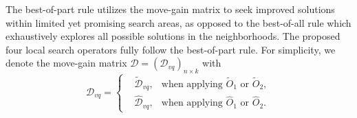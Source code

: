 \documentclass[12pt, a4paper]{article}%
\numberwithin{equation}{section}
\theoremstyle{plain}
\begin{document}
			The best-of-part rule utilizes the move-gain matrix to seek improved solutions within limited yet promising search areas, as opposed to the best-of-all rule which exhaustively explores all possible solutions in the neighborhoods. The proposed four local search operators fully follow the best-of-part rule. For simplicity, we denote the move-gain matrix
			$\mathcal{D} = (\mathcal{D}_{vq})_{n\times k}$ with 			
			\begin{equation}
				\mathcal{D}_{vq}=\left\{
				\begin{aligned}
					& \widetilde{\mathcal{D}}_{vq},&\text{when applying }\widetilde{O}_1\text{ or }\widetilde{O}_2,\\
					& \widehat{\mathcal{D}}_{vq},&\text{when applying }\widehat{O}_1 \text{ or }\widehat{O}_2.
				\end{aligned}
				\right.
			\end{equation}
			
			
			
			
			
\end{document}
